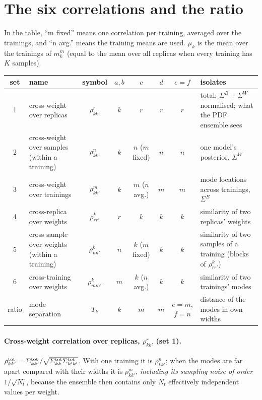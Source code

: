 \documentclass[11pt]{article}
\begin{document}
\section{The six correlations and the ratio}\label{sec:sets}
In the table, ``m fixed'' means one correlation per training, averaged over the trainings, and ``n avg.''
means the training means are used. $\mu_k$ is the mean over the trainings of $m_k^m$ (equal to the mean
over all replicas when every training has $K$ samples).

\begin{center}
\small
\begin{tabular}{c p{3.6cm} c c c c c p{4.6cm}}
\toprule
set & name & symbol & $a,b$ & $c$ & $d$ & $e=f$ & isolates\\
\midrule
1 & cross-weight over replicas & $\rho^{r}_{kk'}$ & $k$ & $r$ & $r$ & $r$ & total: $\Sigma^{B}+\Sigma^{W}$ normalised; what the PDF ensemble sees\\
2 & cross-weight over samples (within a training) & $\rho^{n}_{kk'}$ & $k$ & $n$ ($m$ fixed) & $n$ & $n$ & one model's posterior, $\Sigma^{W}$\\
3 & cross-weight over trainings & $\rho^{m}_{kk'}$ & $k$ & $m$ ($n$ avg.) & $m$ & $m$ & mode locations across trainings, $\Sigma^{B}$\\
4 & cross-replica over weights & $\rho^{k}_{rr'}$ & $r$ & $k$ & $k$ & $k$ & similarity of two replicas' weights\\
5 & cross-sample over weights (within a training) & $\rho^{k}_{nn'}$ & $n$ & $k$ ($m$ fixed) & $k$ & $k$ & similarity of two samples of a training (blocks of $\rho^{k}_{rr'}$)\\
6 & cross-training over weights & $\rho^{k}_{mm'}$ & $m$ & $k$ ($n$ avg.) & $k$ & $k$ & similarity of two trainings' modes\\
ratio & mode separation & $T_k$ & $k$ & $m$ & $m$ & $e=m$, $f=n$ & distance of the modes in own widths\\
\bottomrule
\end{tabular}
\end{center}

\paragraph{Cross-weight correlation over replicas, $\rho^{r}_{kk'}$ (set 1).} $\rho^{\rm tot}_{kk'} = \Sigma^{\rm tot}_{kk'}/\sqrt{\Sigma^{\rm tot}_{kk}\Sigma^{\rm tot}_{k'k'}}$. With one training it is $\rho^{n}_{kk'}$;
when the modes are far apart compared with their widths it is $\rho^{m}_{kk'}$, \emph{including its sampling noise of
order $1/\sqrt{N_t}$}, because the ensemble then contains only $N_t$ effectively independent values per weight.
\end{document}
